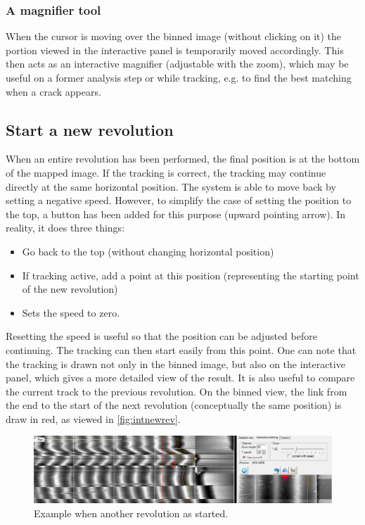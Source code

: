 \subsubsection{A magnifier tool}

When the cursor is moving over the binned image (without clicking on it) the portion viewed in the interactive panel is temporarily moved accordingly. This then acts as an interactive magnifier (adjustable with the zoom), which may be useful on a former analysis step or while tracking, e.g. to find the best matching when a crack appears.

\subsection{Start a new revolution}

When an entire revolution has been performed, the final position is at the bottom of the mapped image. If the tracking is correct, the tracking may continue directly at the same horizontal position. The system is able to move back by setting a negative speed. However, to simplify the case of setting the position to the top, a button has been added for this purpose (upward pointing arrow). In reality, it does three things:

\begin{itemize}
\item Go back to the top (without changing horizontal position)
\item If tracking active, add a point at this position (representing the starting point of the new revolution)
\item Sets the speed to zero.
\end{itemize}

Resetting the speed is useful so that the position can be adjusted before continuing. The tracking can then start easily from this point. One can note that the tracking is drawn not only in the binned image, but also on the interactive panel, which gives a more detailed view of the result. It is also useful to compare the current track to the previous revolution. On the binned view, the link from the end to the start of the next revolution (conceptually the same position) is draw in red, as viewed in \autoref{fig:intnewrev}.

\begin{figure}[!ht]
\centering
\includegraphics[width=1.0\textwidth]{images/int-new-rev}
\caption{Example when another revolution as started.}
\label{fig:intnewrev}
\end{figure}

